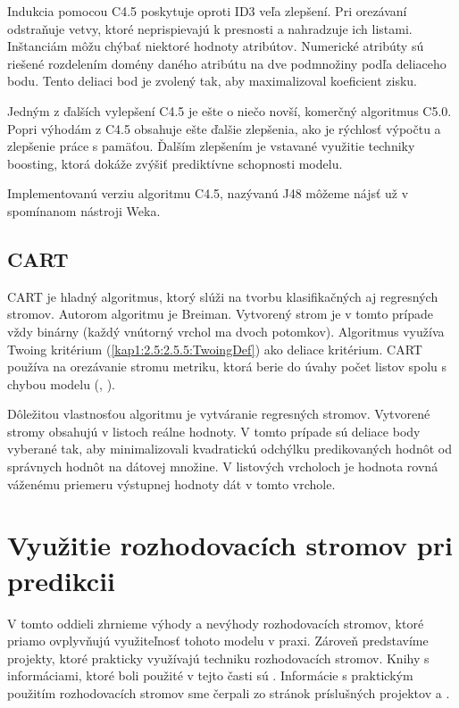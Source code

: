 Indukcia pomocou C4.5 poskytuje oproti ID3 veľa zlepšení. Pri orezávaní odstraňuje vetvy, ktoré neprispievajú k presnosti a nahradzuje ich listami. Inštanciám môžu chýbať niektoré hodnoty atribútov. Numerické atribúty sú riešené rozdelením domény daného atribútu na dve podmnožiny podľa deliaceho bodu. Tento deliaci bod je zvolený tak, aby maximalizoval koeficient zisku.

Jedným z ďalších vylepšení C4.5 je ešte o niečo novší, komerčný algoritmus C5.0. Popri výhodám z C4.5 obsahuje ešte ďalšie zlepšenia, ako je rýchlosť výpočtu a zlepšenie práce s pamäťou. Ďalším zlepšením je vstavané využitie techniky boosting, ktorá dokáže zvýšiť prediktívne schopnosti modelu.

Implementovanú verziu algoritmu C4.5, nazývanú J48 môžeme nájsť už v spomínanom nástroji Weka.

\subsection{CART}\label{kap1:2.7:2.7.5:CART}
CART je hladný algoritmus, ktorý slúži na tvorbu klasifikačných aj regresných stromov. Autorom algoritmu je Breiman. Vytvorený strom je v tomto prípade vždy binárny (každý vnútorný vrchol ma dvoch potomkov). Algoritmus využíva Twoing kritérium (\ref{kap1:2.5:2.5.5:TwoingDef}) ako deliace kritérium. CART používa na orezávanie stromu metriku, ktorá berie do úvahy počet listov spolu s chybou modelu (\cite{wiki-costcompprune}, \cite[s.382]{kap1-DecisionTree}).

Dôležitou vlastnosťou algoritmu je vytváranie regresných stromov. Vytvorené stromy obsahujú v listoch reálne hodnoty. V tomto prípade sú deliace body vyberané tak, aby minimalizovali kvadratickú odchýlku predikovaných hodnôt od správnych hodnôt na dátovej množine. V listových vrcholoch je hodnota rovná váženému priemeru výstupnej hodnoty dát v tomto vrchole.

\section{Využitie rozhodovacích stromov pri predikcii}\label{kap1:2.8:DTUsage}
V tomto oddieli zhrnieme výhody a nevýhody rozhodovacích stromov, ktoré priamo ovplyvňujú využiteľnosť tohoto modelu v praxi. Zároveň predstavíme projekty, ktoré prakticky využívajú techniku rozhodovacích stromov. Knihy s informáciami, ktoré boli použité v tejto časti sú \cite{kap1-DataMiningAndAnalysis,kap1-DataMiningForTrees}. Informácie s praktickým použitím rozhodovacích stromov sme čerpali zo stránok príslušných projektov \cite{online-astronomy} a \cite{online-psychoterapy}.

